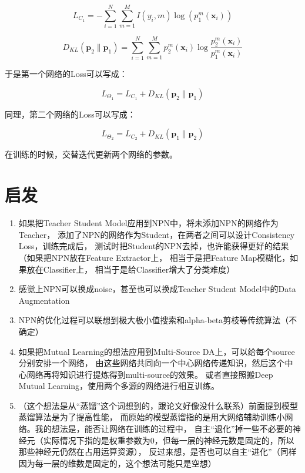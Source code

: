 \documentclass[UTF8]{ctexart}
\begin{document}
                $$
                    L_{C_{1}} = - \sum_{i=1}^{N} \sum_{m=1}^{M} I(y_{i}, m) \log(p_{1}^{m}(\boldsymbol{x}_i))
                $$

                $$
                    D_{KL}(\boldsymbol{p}_{2}\|\boldsymbol{p}_{1}) = \sum_{i=1}^{N} \sum_{m=1}^{M} p_{2}^{m}(\boldsymbol{x}_i) \log \frac{p_{2}^{m}(\boldsymbol{x}_i)}{p_{1}^{m}(\boldsymbol{x}_i)}
                $$

                于是第一个网络的Loss可以写成：

                $$
                    L_{\Theta_{1}} = L_{C_{1}} + D_{KL}(\boldsymbol{p}_{2}\|\boldsymbol{p}_{1})
                $$

                同理，第二个网络的Loss可以写成：

                $$
                    L_{\Theta_{2}} = L_{C_{2}} + D_{KL}(\boldsymbol{p}_{1}\|\boldsymbol{p}_{2})
                $$

                在训练的时候，交替迭代更新两个网络的参数。
    \section{启发}
        \begin{enumerate}
            \item 如果把Teacher Student Model应用到NPN中，将未添加NPN的网络作为Teacher，
                添加了NPN的网络作为Student，在两者之间可以设计Consistency Loss，训练完成后，
                测试时把Student的NPN去掉，也许能获得更好的结果（如果把NPN放在Feature Extractor上，
                相当于是把Feature Map模糊化，如果放在Classifier上，
                相当于是给Classifier增大了分类难度）
            \item 感觉上NPN可以换成noise，甚至也可以换成Teacher Student Model中的Data Augmentation
            \item NPN的优化过程可以联想到极大极小值搜索和alpha-beta剪枝等传统算法（不确定）
            \item 如果把Mutual Learning的想法应用到Multi-Source DA上，可以给每个source分别安排一个网络，
                由这些网络共同向一个中心网络传递知识，然后这个中心网络再将知识进行提炼得到multi-source的效果。
                或者直接照搬Deep Mutual Learning，使用两个多源的网络进行相互训练。
            \item （这个想法是从“蒸馏”这个词想到的，跟论文好像没什么联系）前面提到模型蒸馏算法是为了提高性能，
                而原始的模型蒸馏指的是用大网络辅助训练小网络。我的想法是，能否让网络在训练的过程中，
                自主“退化”掉一些不必要的神经元（实际情况下指的是权重参数为0，但每一层的神经元数是固定的，所以那些神经元仍然在占用运算资源），
                反过来想，是否也可以自主“进化”（同样因为每一层的维数是固定的，这个想法可能只是空想）
        \end{enumerate}
\end{document}
